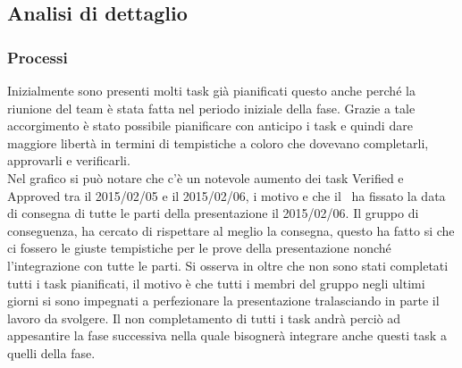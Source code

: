 		\subsection{Analisi di dettaglio}
		\subsubsection{Processi}
		Inizialmente sono presenti molti task già pianificati questo anche perché la  riunione del team è stata fatta nel periodo iniziale della fase. Grazie a tale accorgimento è stato possibile pianificare con anticipo i task e quindi dare maggiore libertà in termini di tempistiche a coloro che dovevano completarli,  approvarli e verificarli.  \\
		Nel grafico si può notare che c'è un notevole aumento dei task Verified e Approved tra il 2015/02/05 e il 2015/02/06, i motivo e che il \roleProjectManager \ ha fissato la data di consegna di tutte le parti della presentazione il 2015/02/06. Il gruppo di conseguenza, ha cercato di rispettare al meglio la consegna, questo ha fatto si che ci fossero le giuste tempistiche per le prove della presentazione nonché l'integrazione con tutte le parti. Si osserva in oltre che non sono stati completati tutti i task pianificati, il motivo è che tutti i membri del gruppo negli ultimi giorni si sono impegnati a perfezionare la presentazione tralasciando in parte il lavoro da svolgere. Il non completamento di tutti i task andrà perciò ad appesantire la fase successiva nella quale bisognerà integrare anche questi task a quelli della fase.
